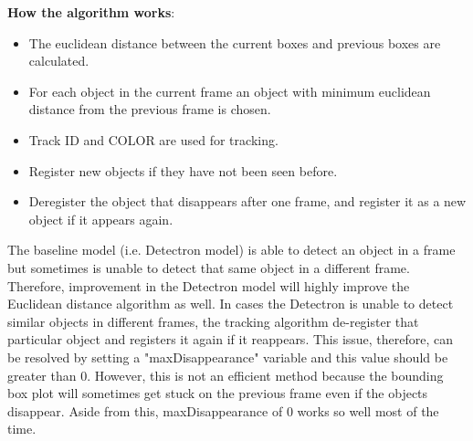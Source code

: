 \documentclass[11pt,a4paper]{article}
\begin{document}
\textbf{How the algorithm works}: 
\begin{itemize}
	\itemsep0em 
	\item The euclidean distance between the current boxes and previous boxes are calculated. 
	\item For each object in the current frame an object with minimum euclidean distance from the previous frame is chosen.
	\item Track ID and COLOR are used for tracking.
	\item Register new objects if they have not been seen before.
	\item Deregister the object that disappears after one frame, and register it as a new object if it appears again. 
\end{itemize}

The baseline model (i.e. Detectron model) is able to detect an object in a frame but sometimes is unable to detect that same object in a different frame. Therefore, improvement in the Detectron model will highly improve the Euclidean distance algorithm as well. In cases the Detectron is unable to detect similar objects in different frames, the tracking algorithm de-register that particular object and registers it again if it reappears. This issue, therefore, can be resolved by setting a "maxDisappearance" variable and this value should be greater than 0. However, this is not an efficient method because the bounding box plot will sometimes get stuck on the previous frame even if the objects disappear. Aside from this, maxDisappearance  of 0 works so well most of the time.\\
\end{document}
